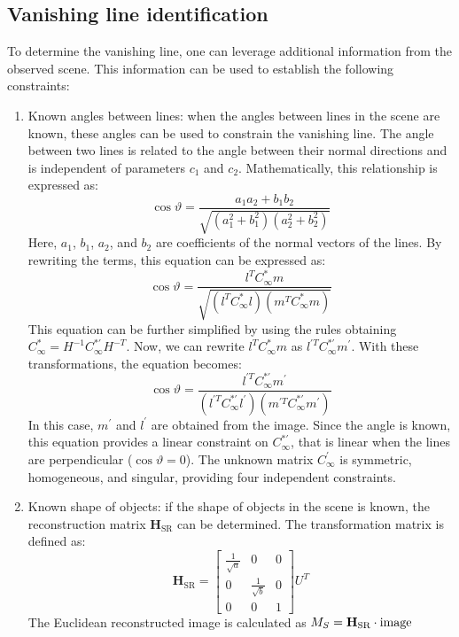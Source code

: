 \subsection{Vanishing line identification}
To determine the vanishing line, one can leverage additional information from the observed scene. 
This information can be used to establish the following constraints:
\begin{enumerate}
    \item Known angles between lines: when the angles between lines in the scene are known, these angles can be used to constrain the vanishing line. 
        The angle between two lines is related to the angle between their normal directions and is independent of parameters $c_1$ and $c_2$. 
        Mathematically, this relationship is expressed as:
        \[\cos\vartheta=\dfrac{a_1a_2+b_1b_2}{\sqrt{(a_1^2+b_1^2)(a_2^2+b_2^2)}}\]
        Here, $a_1$, $b_1$, $a_2$, and $b_2$ are coefficients of the normal vectors of the lines. 
        By rewriting the terms, this equation can be expressed as: 
        \[\cos\vartheta=\dfrac{l^TC_{\infty}^\ast m}{\sqrt{(l^TC_{\infty}^\ast l)(m^TC_{\infty}^\ast m)}}\]
        This equation can be further simplified by using the rules obtaining $C_{\infty}^\ast=H^{-1}C_{\infty}^{*'}H^{-T}$.  
        Now, we can rewrite $l^TC_{\infty}^\ast m$ as $l^{\prime T}C_{\infty}^{*'}m^\prime$. 
        With these transformations, the equation becomes:
        \[\cos\vartheta=\dfrac{l^{\prime T}C_{\infty}^{*'}m^\prime}{(l^{\prime T}C_{\infty}^{*'}l^\prime)(m^{\prime T}C_{\infty}^{*'}m^\prime)}\]
        In this case, $m^\prime$ and $l^\prime$ are obtained from the image. 
        Since the angle is known, this equation provides a linear constraint on $C_{\infty}^{*'}$, that is linear when the lines are perpendicular ($\cos\vartheta=0$).
        The unknown matrix $C_{\infty}^\prime$ is symmetric, homogeneous, and singular, providing four independent constraints.
    \item Known shape of objects: if the shape of objects in the scene is known, the reconstruction matrix $\mathbf{H}_\text{SR}$ can be determined. 
        The transformation matrix is defined as:
        \[\mathbf{H}_\text{SR}=
        \begin{bmatrix}
            \frac{1}{\sqrt{a}} & 0 & 0 \\
            0 & \frac{1}{\sqrt{b}} & 0 \\
            0 & 0 & 1
        \end{bmatrix}
        U^T
        \]
        The Euclidean reconstructed image is calculated as $M_S=\mathbf{H}_\text{SR} \cdot \textnormal{image}$

\end{enumerate}
